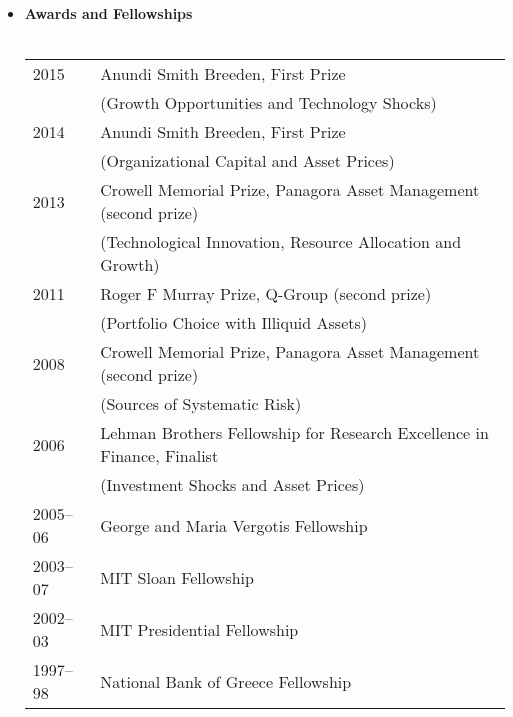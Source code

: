 \documentclass[11pt,letterpaper,serif,overlapped]{res}
\begin{document}
\begin{resume}
\begin{itemize}
\item \textbf{Awards and Fellowships}\\ \\
\begin{tabular}{ll}
2015 & Anundi Smith Breeden, First Prize\\ &  (Growth Opportunities and Technology Shocks)\\
2014 & Anundi Smith Breeden, First Prize \\ & (Organizational Capital and Asset Prices)\\
2013 & Crowell Memorial Prize, Panagora Asset Management (second prize)\\& (Technological Innovation, Resource Allocation and Growth)\\
2011 & Roger F Murray Prize, Q-Group (second prize)\\ & (Portfolio Choice with Illiquid Assets)\\
2008 & Crowell Memorial Prize, Panagora Asset Management (second prize) \\ & (Sources of Systematic Risk) \\
2006  & Lehman Brothers Fellowship for Research Excellence in Finance, Finalist\\ & (Investment Shocks and Asset Prices)\\
2005--06 & George and Maria Vergotis Fellowship\\
2003--07 & MIT Sloan Fellowship\\
2002--03 & MIT Presidential Fellowship\\
1997--98 & National Bank of Greece Fellowship \\
\end{tabular}

\end{itemize}



\end{resume}
\end{document}
